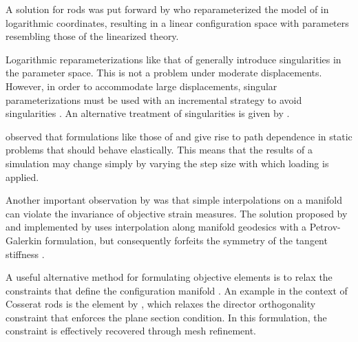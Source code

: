 \begin{description}
    A solution for rods was put forward %
    by \cite{cardona1988beam,ibrahimbegović1995computational} who reparameterized the model of \cite{simo1985finite} in logarithmic coordinates, resulting in a linear configuration space 
    with parameters resembling those of the linearized theory.
%
  \item[Nonsingular parameters.]
    Logarithmic reparameterizations like that of %
    \cite{ibrahimbegović1995computational} %
    generally introduce singularities in the parameter space. 
    This is not a problem
    under moderate displacements. 
    However, in order to accommodate large displacements, singular parameterizations
    must be used with 
    an incremental strategy
    to avoid %
    singularities \citep{ibrahimbegovic1997choice}.
    An alternative treatment of singularities is given by \cite{makinen2007total}.

  \item[Path independence.]
    \cite{crisfield1999objectivity} 
    observed that
    formulations like those of \cite{simo1986threedimensional} and \cite{ibrahimbegovic1997choice}
    give rise to 
    path dependence in static problems that should behave elastically. This means that the results of a simulation may change simply by varying the step size with which loading is applied.
%
  \item[Strain objectivity.]
    Another important observation by \cite{crisfield1999objectivity} was that simple interpolations
    on a manifold can violate the invariance of objective strain measures.
    The solution proposed by \cite{crisfield1999objectivity} and implemented by 
    \cite{jelenić1999geometrically,eugster2023family}
    uses interpolation along manifold geodesics with a Petrov-Galerkin formulation, 
    but consequently forfeits the symmetry of the tangent stiffness \citep{romero2004interpolation}.
%
%
  \item[Director constraints.]
    A useful alternative method
    for formulating %
    objective elements is to relax the constraints
    that define 
    the  configuration manifold \citep{romero2008comparison}.
    An example in the context of Cosserat rods is the element by
    \cite{armero2003energydissipative},
    which relaxes %
    the director orthogonality constraint
    that enforces the plane section condition. 
    In this formulation, the constraint is effectively recovered through mesh refinement.
%    
\end{description}
